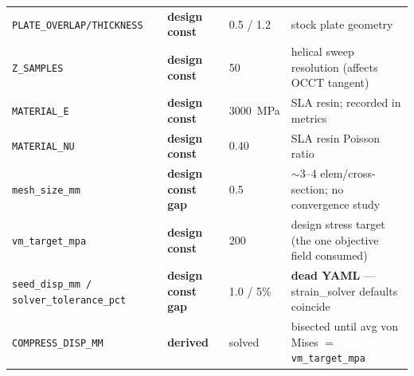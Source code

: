 \documentclass[11pt]{article}
\newcommand{\param}[1]{\texttt{#1}}
\newcommand{\sDeriv}{\textcolor{NavyBlue}{\textbf{derived}}}
\newcommand{\sConst}{\textcolor{RawSienna}{\textbf{design const}}}
\newcommand{\sGap}{\textcolor{BrickRed}{\textbf{gap}}}
\begin{document}
\begin{longtable}{@{}p{} p{} p{} p{}@{}}
\param{PLATE\_OVERLAP/THICKNESS} & \sConst & 0.5 / 1.2 & stock plate geometry \\
\param{Z\_SAMPLES}       & \sConst & 50 & helical sweep resolution (affects OCCT tangent) \\
\midrule
\param{MATERIAL\_E}      & \sConst & \SI{3000}{MPa} & SLA resin; recorded in metrics \\
\param{MATERIAL\_NU}     & \sConst & 0.40 & SLA resin Poisson ratio \\
\param{mesh\_size\_mm}   & \sConst\,\sGap & 0.5 & $\sim$3--4 elem/cross-section; no convergence study \\
\param{vm\_target\_mpa}  & \sConst & 200 & design stress target (the one objective field consumed) \\
\param{seed\_disp\_mm / solver\_tolerance\_pct} & \sConst\,\sGap & 1.0 / 5\% & \textbf{dead YAML} --- strain\_solver defaults coincide \\
\param{COMPRESS\_DISP\_MM} & \sDeriv & solved & bisected until avg von Mises $=$ \param{vm\_target\_mpa} \\
\bottomrule
\end{longtable}

\end{document}

